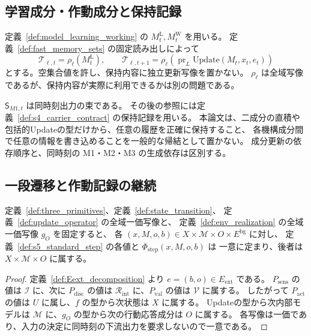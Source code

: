 \subsection{学習成分・作動成分と保持記録}
\label{subsec:memory_dyn}
\label{subsubsec:s5_memory_update}
\begin{definition}[保持内容の時刻間読み出し]
\label{def:memory_intertime_update}
定義~\ref{def:model_learning_working} の $M_t^{\mathrm L},M_t^{\mathrm W}$ を用いる。
定義~\ref{def:fast_memory_sets} の固定読み出しによって
\[
\mathcal T_{\ell,t}=\rho_\ell(M_t^{\mathrm L}),\qquad
\mathcal T_{\ell,t+1}=\rho_\ell(\operatorname{pr}_L\mathrm{Update}(M_t,x_t,e_t))
\]
とする。空集合値を許し、保持内容に独立更新写像を置かない。
$\rho_\ell$ は全域写像であるが、保持内容が実際に利用できるかは別の問題である。
\end{definition}

\begin{remark}[M1内部状態と履歴の担体]
\label{rem:s5_m1_state_ref}
$\mathsf S_{M1,t}$ は同時刻出力の束である。
その後の参照には定義~\ref{def:s4_carrier_contract} の保持記録を用いる。
本論文は、二成分の直積や包括的Updateの型だけから、任意の履歴を正確に保持すること、
各機構成分間で任意の情報を書き込めることを一般的な帰結として置かない。
成分更新の依存順序と、同時刻の M1・M2・M3 の生成依存は区別する。
\end{remark}

\subsection{一段遷移と作動記録の継続}
\label{subsec:s5_continuation}
\begin{proposition}[P1：一段の整形式性]
\label{prop:s5_one_step}
定義~\ref{def:three_primitives}、定義~\ref{def:state_transition}、
定義~\ref{def:update_operator} の全域一価写像と、
定義~\ref{def:env_realization} の全域一価写像 $g_O$ を固定すると、
各 $(x,M,o,b)\in X\times\mathcal M\times O\times E^{\mathrm{bg}}$ に対し、
定義~\ref{def:s5_standard_step} の各値と $\Phi_{\mathrm{step}}(x,M,o,b)$ は
一意に定まり、後者は $X\times\mathcal M\times O$ に属する。
\end{proposition}
\begin{proof}
定義~\ref{def:Eext_decomposition} より $e=(b,o)\in E_{\mathrm{ext}}$ である。
$P_{\mathrm{sens}}$ の値は $\mathcal I$ に、次に $P_{\mathrm{disc}}$ の値は
$\mathcal R_{\mathrm{int}}$ に、$P_{\mathrm{val}}$ の値は $\mathcal V$ に属する。
したがって $P_{\mathrm{act}}$ の値は $U$ に属し、$f$ の型から次状態は $X$ に属する。
Updateの型から次内部モデルは $\mathcal M$ に、$g_O$ の型から次の行動応答成分は $O$ に属する。
各写像は一価であり、入力の決定に同時刻の下流出力を要求しないので一意である。
\end{proof}

